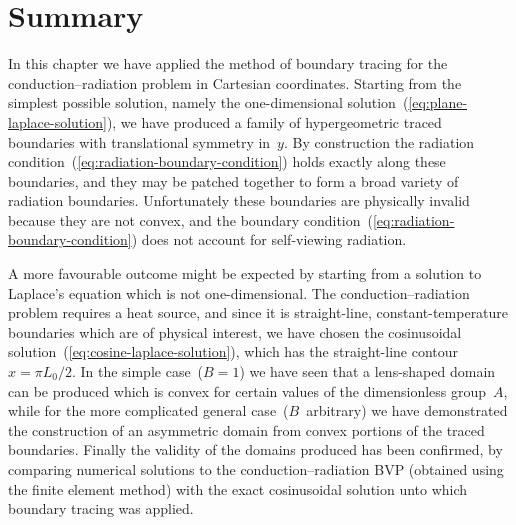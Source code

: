 \section{Summary}
\label{sec:cartesian.summary}

In this chapter we have applied the method of boundary tracing
for the conduction--radiation problem in Cartesian coordinates.
Starting from the simplest possible solution,
namely the one-dimensional solution~(\ref{eq:plane-laplace-solution}),
we have produced
a family of hypergeometric traced boundaries
with translational symmetry in~$y$.
By construction
the radiation condition~(\ref{eq:radiation-boundary-condition})
holds exactly along these boundaries,
and they may be patched together
to form a broad variety of radiation boundaries.
Unfortunately these boundaries are physically invalid
because they are not convex,
and the boundary condition~(\ref{eq:radiation-boundary-condition})
does not account for self-viewing radiation.

A more favourable outcome might be expected
by starting from a solution to Laplace's equation
which is not one-dimensional.
The conduction--radiation problem requires a heat source,
and since it is straight-line, constant-temperature boundaries
which are of physical interest,
we have chosen the cosinusoidal solution~(\ref{eq:cosine-laplace-solution}),
which has the straight-line contour~$x = \pi L_0/2$.
In the simple case~($B = 1$)
we have seen that a lens-shaped domain can be produced
which is convex for certain values of the dimensionless group~$A$,
while for the more complicated general case~($B$~arbitrary)
we have demonstrated the construction of an asymmetric domain
from convex portions of the traced boundaries.
Finally the validity of the domains produced has been confirmed,
by comparing numerical solutions to the conduction--radiation BVP
(obtained using the finite element method)
with the exact cosinusoidal solution
unto which boundary tracing was applied.
